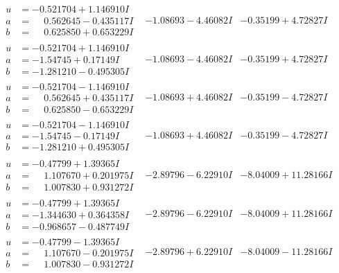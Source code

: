 \documentclass[1p]{elsarticle_modified}
\theoremstyle{definition}
\begin{document}
$$\begin{array}{c|c|c}
\begin{aligned}
u &= -0.521704 + 1.146910 I \\
a &= \phantom{-}0.562645 - 0.435117 I \\
b &= \phantom{-}0.625850 + 0.653229 I\end{aligned}
 & -1.08693 - 4.46082 I & -0.35199 + 4.72827 I \\ \hline\begin{aligned}
u &= -0.521704 + 1.146910 I \\
a &= -1.54745 + 0.17149 I \\
b &= -1.281210 - 0.495305 I\end{aligned}
 & -1.08693 - 4.46082 I & -0.35199 + 4.72827 I \\ \hline\begin{aligned}
u &= -0.521704 - 1.146910 I \\
a &= \phantom{-}0.562645 + 0.435117 I \\
b &= \phantom{-}0.625850 - 0.653229 I\end{aligned}
 & -1.08693 + 4.46082 I & -0.35199 - 4.72827 I \\ \hline\begin{aligned}
u &= -0.521704 - 1.146910 I \\
a &= -1.54745 - 0.17149 I \\
b &= -1.281210 + 0.495305 I\end{aligned}
 & -1.08693 + 4.46082 I & -0.35199 - 4.72827 I \\ \hline\begin{aligned}
u &= -0.47799 + 1.39365 I \\
a &= \phantom{-}1.107670 + 0.201975 I \\
b &= \phantom{-}1.007830 + 0.931272 I\end{aligned}
 & -2.89796 - 6.22910 I & -8.04009 + 11.28166 I \\ \hline\begin{aligned}
u &= -0.47799 + 1.39365 I \\
a &= -1.344630 + 0.364358 I \\
b &= -0.968657 - 0.487749 I\end{aligned}
 & -2.89796 - 6.22910 I & -8.04009 + 11.28166 I \\ \hline\begin{aligned}
u &= -0.47799 - 1.39365 I \\
a &= \phantom{-}1.107670 - 0.201975 I \\
b &= \phantom{-}1.007830 - 0.931272 I\end{aligned}
 & -2.89796 + 6.22910 I & -8.04009 - 11.28166 I \\ \hline\begin{aligned}

\end{aligned}
\end{array}$$
\end{document}
